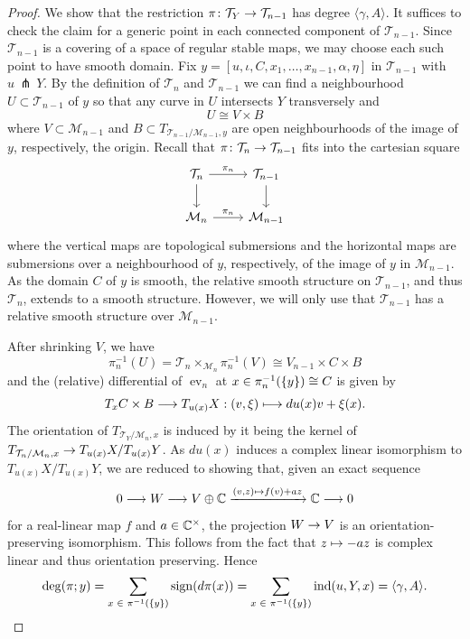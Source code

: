 \documentclass[AHL,Unicode,longabstracts]{cedram}
\newcommand{\sub}{\subset}
\newcommand{\units}{^\times}
\newcommand{\inv}{^{-1}}
\newcommand{\lspan}[1]{\langle {#1}\rangle}
\newcommand{\inpr}[2]{\langle {#1},{#2} \rangle}
\newcommand{\cl}{\colon}
\newcommand{\pf}{\,\pitchfork\,}
\newcommand{\bC}{\mathbb{C}}
\newcommand{\cM}{\mathcal{M}}
\newcommand{\cT}{\mathcal{T}}
\DeclareMathOperator{\eva}{ev}
\DeclareMathOperator{\sign}{sign}
\DeclareMathOperator{\ind}{ind}
\newcommand{\xra}{\xrightarrow}
\renewcommand*{\to}{\mathchoice{\longrightarrow}{\rightarrow}{\rightarrow}{\rightarrow}}
\let\oldmapsto\mapsto
\renewcommand*{\mapsto}{\mathchoice{\longmapsto}{\oldmapsto}{\oldmapsto}{\oldmapsto}}
\let\oldin\in
\renewcommand{\in}{\mathchoice{\oldin}{\oldin}{\,\oldin\,}{\,\oldin\,}}
\begin{document}
\begin{proof}
We show that the restriction $\pi\cl\cT_Y\to \cT_{n-1}$ has degree $\inpr{\gamma}{A}$. It suffices to check the claim for a generic point in each connected component of $\cT_{n-1}$. Since $\cT_{n-1}$ is a covering of a space of regular stable maps, we may choose each such point to have smooth domain. Fix $y = [u,\iota,C,x_1,\dots,x_{n-1},\alpha,\eta]$ in $\cT_{n-1}$ with $u \pf Y$. By the definition of $\cT_n$ and $\cT_{n-1}$ we can find a neighbourhood $U\sub \cT_{n-1}$ of $y$ so that any curve in $U$ intersects $Y$ transversely and
\[
U\cong V\times B
\]
where $V\sub \cM_{n-1}$ and $B \sub T_{\cT_{n-1}/\cM_{n-1},y}$ are open neighbourhoods of the image of $y$, respectively, the origin. Recall that $\pi \cl \cT_n \to \cT_{n-1}$ fits into the cartesian square
\[
\begin{tikzcd}
\cT_{n} \arrow[r,"\pi_n"] \arrow[d,""]&\cT_{n-1} \arrow[d,""]\\ \cM_{n} \arrow[r,"\pi_n"] & \cM_{n-1}
\end{tikzcd}
\]
where the vertical maps are topological submersions and the horizontal maps are submersions over a neighbourhood of $y$, respectively, of the image of $y$ in $\cM_{n-1}$. As the domain $C$ of $y$ is smooth, the relative smooth structure on $\cT_{n-1}$, and thus $\cT_{n}$, extends to a smooth structure. However, we will only use that $\cT_{n-1}$ has a relative smooth structure over $\cM_{n-1}$.

After shrinking $V$, we have
\[
\pi_n\inv(U) = \cT_n \times_{\cM_n} \pi_n\inv(V) \cong V_{n-1}\times C\times B
\]
and the (relative) differential of $\eva_n$ at $x \in \pi_n\inv(\{y\})\cong C$ is given by
\[
T_{x} C \times B \to T_{u(x)}X : (v,\xi) \mapsto du(x)v + \xi(x).
\]
The orientation of $T_{\cT_Y/\cM_n,x}$ is induced by it being the kernel of $T_{\cT_n/\cM_n,x}\to\linebreak T_{u(x)}X/T_{u(x)}Y$. As $du(x)$ induces a complex linear isomorphism to $T_{u(x)}X/T_{u(x)}Y$, we are reduced to showing that, given an exact sequence
\[
0 \to W\to V\oplus \bC\xra{(v,z)\mapsto f(v) + az} \bC\to 0
\]
for a real-linear map $f$ and $a \in \bC\units$, the projection $W\to V$ is an orientation-preserving isomorphism. This follows from the fact that $z \mapsto -az$ is complex linear and thus orientation preserving. Hence
\[
\deg(\pi;y) =\sum_{x\in \pi\inv(\{y\})}{\sign(d\pi(x))} = \sum_{x\in \pi \inv(\{y\})}{\ind(u,Y,x)} = \lspan{\gamma,A}.\qedhere
\]
\end{proof}
\end{document}
